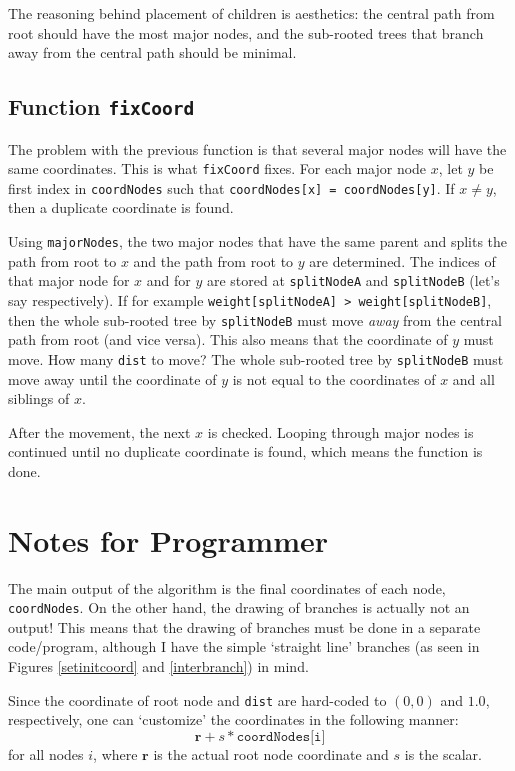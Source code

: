 \documentclass{article}
\theoremstyle{plain}
\theoremstyle{remark}
\begin{document}
The reasoning behind placement of children is aesthetics: the central path from root should have the most major nodes, and the sub-rooted trees that branch away from the central path should be minimal.

\subsection{Function \texttt{fixCoord}}
The problem with the previous function is that several major nodes will have the same coordinates. This is what \texttt{fixCoord} fixes. For each major node $x$, let $y$ be first index in \texttt{coordNodes} such that \texttt{coordNodes[x] = coordNodes[y]}. If $x \ne y$, then a duplicate coordinate is found.

Using \texttt{majorNodes}, the two major nodes that have the same parent and splits the path from root to $x$ and the path from root to $y$ are determined. The indices of that major node for $x$ and for $y$ are stored at \texttt{splitNodeA} and \texttt{splitNodeB} (let's say respectively). If for example \texttt{weight[splitNodeA] > weight[splitNodeB]}, then the whole sub-rooted tree by \texttt{splitNodeB} must move \textit{away} from the central path from root (and vice versa). This also means that the coordinate of $y$ must move. How many \texttt{dist} to move? The whole sub-rooted tree by \texttt{splitNodeB} must move away until the coordinate of $y$ is not equal to the coordinates of $x$ and all siblings of $x$.

After the movement, the next $x$ is checked. Looping through major nodes is continued until no duplicate coordinate is found, which means the function is done.

\section{Notes for Programmer}
The main output of the algorithm is the final coordinates of each node, \texttt{coordNodes}. On the other hand, the drawing of branches is actually not an output! This means that the drawing of branches must be done in a separate code/program, although I have the simple `straight line' branches (as seen in Figures \ref{setinitcoord} and \ref{interbranch}) in mind.

Since the coordinate of root node and \texttt{dist} are hard-coded to $(0,0)$ and $1.0$, respectively, one can `customize' the coordinates in the following manner: $$\mathbf{r} + s * \texttt{coordNodes[i]}$$
for all nodes $i$, where $\mathbf{r}$ is the actual root node coordinate and $s$ is the scalar.
\end{document}

